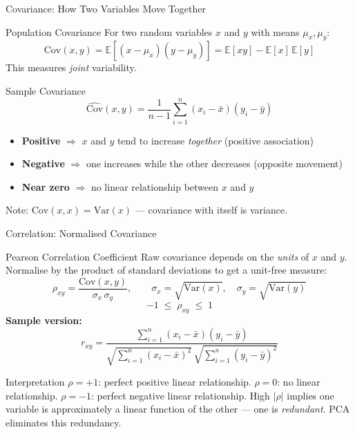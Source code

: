 \documentclass{beamer}
\begin{document}
\begin{frame}[shrink=10]{Covariance: How Two Variables Move Together}
  \begin{block}{Population Covariance}
    For two random variables $x$ and $y$ with means $\mu_x, \mu_y$:
    \[
      \mathrm{Cov}(x,y)
        = \mathbb{E}\!\left[(x-\mu_x)(y-\mu_y)\right]
        = \mathbb{E}[xy] - \mathbb{E}[x]\,\mathbb{E}[y]
    \]
    This measures \emph{joint} variability.
  \end{block}

  \medskip

  \begin{block}{Sample Covariance}
    \[
      \widehat{\mathrm{Cov}}(x,y)
        = \frac{1}{n-1}\sum_{i=1}^{n}(x_i - \bar{x})(y_i - \bar{y})
    \]
    \begin{itemize}\setlength\itemsep{4pt}
      \item \textbf{Positive} $\Rightarrow$ $x$ and $y$ tend to increase
            \emph{together} (positive association)
      \item \textbf{Negative} $\Rightarrow$ one increases while the other
            decreases (opposite movement)
      \item \textbf{Near zero} $\Rightarrow$ no linear relationship between
            $x$ and $y$
    \end{itemize}
    Note: $\mathrm{Cov}(x,x) = \mathrm{Var}(x)$ --- covariance with
    itself is variance.
  \end{block}
\end{frame}

\begin{frame}[shrink=10]{Correlation: Normalised Covariance}
  \begin{block}{Pearson Correlation Coefficient}
    Raw covariance depends on the \emph{units} of $x$ and $y$.
    Normalise by the product of standard deviations to get a
    unit-free measure:
    \[
      \rho_{xy}
        = \frac{\mathrm{Cov}(x,y)}{\sigma_x\,\sigma_y},
      \qquad
      \sigma_x = \sqrt{\mathrm{Var}(x)},\quad
      \sigma_y = \sqrt{\mathrm{Var}(y)}
    \]
    \[
      -1 \;\leq\; \rho_{xy} \;\leq\; 1
    \]
    \textbf{Sample version:}
    \[
      r_{xy}
        = \frac{\displaystyle\sum_{i=1}^n(x_i-\bar{x})(y_i-\bar{y})}
               {\displaystyle\sqrt{\sum_{i=1}^n(x_i-\bar{x})^2}
                \,\sqrt{\sum_{i=1}^n(y_i-\bar{y})^2}}
    \]
  \end{block}

  \begin{exampleblock}{Interpretation}
    $\rho = +1$: perfect positive linear relationship.
    $\rho = 0$: no linear relationship.
    $\rho = -1$: perfect negative linear relationship.
    High $|\rho|$ implies one variable is approximately a linear
    function of the other --- one is \emph{redundant}.
    PCA eliminates this redundancy.
  \end{exampleblock}
\end{frame}
\end{document}
